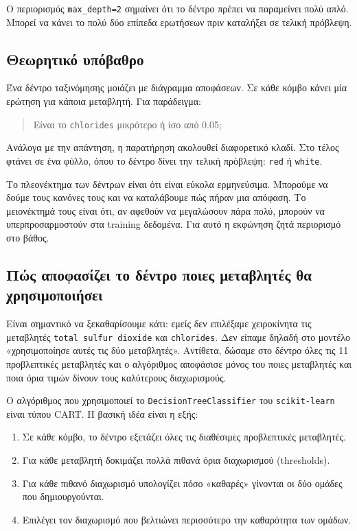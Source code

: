 \documentclass[12pt,a4paper]{article}
\newcommand{\code}[1]{\texttt{\textenglish{#1}}}
\begin{document}
Ο περιορισμός \code{max\_depth=2} σημαίνει ότι το δέντρο πρέπει να παραμείνει
πολύ απλό. Μπορεί να κάνει το πολύ δύο επίπεδα ερωτήσεων πριν καταλήξει σε
τελική πρόβλεψη.

\subsection{Θεωρητικό υπόβαθρο}

Ένα δέντρο ταξινόμησης μοιάζει με διάγραμμα αποφάσεων. Σε κάθε κόμβο κάνει μία
ερώτηση για κάποια μεταβλητή. Για παράδειγμα:

\begin{quote}
Είναι το \code{chlorides} μικρότερο ή ίσο από 0.05;
\end{quote}

Ανάλογα με την απάντηση, η παρατήρηση ακολουθεί διαφορετικό κλαδί. Στο τέλος
φτάνει σε ένα φύλλο, όπου το δέντρο δίνει την τελική πρόβλεψη:
\code{red} ή \code{white}.

Το πλεονέκτημα των δέντρων είναι ότι είναι εύκολα ερμηνεύσιμα. Μπορούμε να
δούμε τους κανόνες τους και να καταλάβουμε πώς πήραν μια απόφαση. Το
μειονέκτημά τους είναι ότι, αν αφεθούν να μεγαλώσουν πάρα πολύ, μπορούν να
υπερπροσαρμοστούν στα training δεδομένα. Για αυτό η εκφώνηση ζητά περιορισμό
στο βάθος.

\subsection{Πώς αποφασίζει το δέντρο ποιες μεταβλητές θα χρησιμοποιήσει}

Είναι σημαντικό να ξεκαθαρίσουμε κάτι: εμείς δεν επιλέξαμε χειροκίνητα τις
μεταβλητές \code{total sulfur dioxide} και \code{chlorides}. Δεν είπαμε δηλαδή
στο μοντέλο «χρησιμοποίησε αυτές τις δύο μεταβλητές». Αντίθετα, δώσαμε στο
δέντρο όλες τις 11 προβλεπτικές μεταβλητές και ο αλγόριθμος αποφάσισε μόνος
του ποιες μεταβλητές και ποια όρια τιμών δίνουν τους καλύτερους διαχωρισμούς.

Ο αλγόριθμος που χρησιμοποιεί το \code{DecisionTreeClassifier} του
\code{scikit-learn} είναι τύπου CART. Η βασική ιδέα είναι η εξής:

\begin{enumerate}
    \item Σε κάθε κόμβο, το δέντρο εξετάζει όλες τις διαθέσιμες προβλεπτικές
    μεταβλητές.
    \item Για κάθε μεταβλητή δοκιμάζει πολλά πιθανά όρια διαχωρισμού
    (\textenglish{thresholds}).
    \item Για κάθε πιθανό διαχωρισμό υπολογίζει πόσο «καθαρές» γίνονται οι
    δύο ομάδες που δημιουργούνται.
    \item Επιλέγει τον διαχωρισμό που βελτιώνει περισσότερο την καθαρότητα των
    ομάδων.
\end{enumerate}
\end{document}
